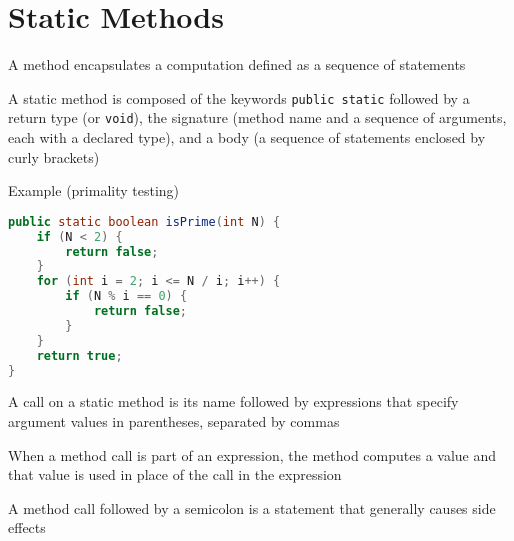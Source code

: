 \documentclass[8pt,a4paper,compress]{beamer}
\begin{document}
\section{Static Methods}
\begin{frame}[fragile]
\pause

A method encapsulates a computation defined as a sequence of statements

\pause
\bigskip

A static method is composed of the keywords \lstinline{public static} followed by a return type (or \lstinline{void}), the signature (method name and a sequence of arguments, each with a declared type), and a body (a sequence of statements enclosed by curly brackets)

\pause
\bigskip

Example (primality testing)
\begin{lstlisting}[language=Java]
public static boolean isPrime(int N) {
    if (N < 2) {
        return false;
    }
    for (int i = 2; i <= N / i; i++) {
        if (N % i == 0) {
            return false;
        }
    }
    return true;
}
\end{lstlisting}

\pause
\bigskip

A call on a static method is its name followed by expressions that specify argument values in parentheses, separated by commas

\pause
\bigskip

When a method call is part of an expression, the method computes a value and that value is used in place of the call in the expression

\pause
\bigskip

A method call followed by a semicolon is a statement that generally causes side effects
\end{frame}
\end{document}
